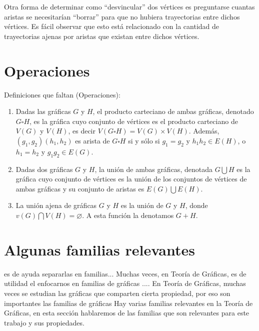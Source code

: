 Otra forma de determinar como ``desvincular'' dos v\'ertices es preguntarse
cuantas aristas se necesitar\'ian ``borrar'' para que no hubiera trayectorias
entre dichos v\'ertices. Es f\'acil observar que esto est\'a relacionado con la
cantidad de trayectorias ajenas por aristas
que existan entre dichos
v\'ertices.

\section{Operaciones}
\label{sec:operaciones}

\begin{definicion} Definiciones que faltan (Operaciones):
\begin{enumerate}
    \item Dadas las gr\'aficas $G$ y $H$, el producto carteciano de ambas
    gr\'aficas, denotado $G \square H$, es la gr\'afica cuyo conjunto de
    v\'ertices es el producto carteciano de $V(G)$ y $V(H)$, es decir $V(G
    \square H) = V(G) \times V(H)$. Adem\'as, $(g_1,g_2)(h_1,h_2)$ es arista
    de $G \square H$ si y s\'olo si $g_1 = g_2$ y $h_1h_2 \in E(H)$, o $h_1
    = h_2$ y $g_1g_2 \in E(G)$.
    \item Dadas dos gr\'aficas $G$ y $H$, la uni\'on de ambas gr\'aficas,
    denotada $G \bigcup H$ es la gr\'afica cuyo conjunto de v\'ertices es la
    uni\'on de los conjuntos de v\'ertices de ambas gr\'aficas y su conjunto
    de aristas es $E(G) \bigcup E(H)$. 
    \item La uni\'on ajena de gr\'aficas $G$ y $H$ es la uni\'on de $G$ y
    $H$, donde $v(G) \bigcap V(H) = \varnothing$. A esta funci\'on la
    denotamos $G + H$. 
\end{enumerate}
\end{definicion}


\section{Algunas familias relevantes}
\label{sec:famGraf}
    
 es de ayuda
separarlas en familias... Muchas veces, en Teor\'ia de Gr\'aficas, es de utilidad
el enfocarnos en familias de gr\'aficas .... En
Teor\'ia de Gr\'aficas, muchas veces se estudian las gr\'aficas que comparten
cierta propiedad, por eso son importantes las familias de gr\'aficas     
Hay varias familias relevantes en la Teor\'ia de Gr\'aficas, en esta
    secci\'on hablaremos de las familias que son relevantes para este trabajo y
    sus propiedades.

